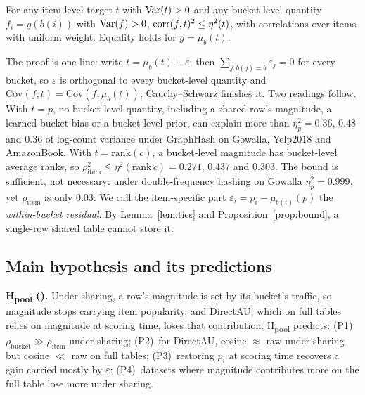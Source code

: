 \begin{proposition}\label{prop:bound}
For any item-level target $t$ with $\operatorname{Var}(t)>0$ and any bucket-level quantity $f_i=g(b(i))$ with $\operatorname{Var}(f)>0$, $\operatorname{corr}(f,t)^2\le\eta^2(t)$, with correlations over items with uniform weight. Equality holds for $g=\mu_b(t)$.
\end{proposition}
The proof is one line: write $t=\mu_{b}(t)+\varepsilon$; then $\sum_{j:b(j)=b}\varepsilon_j=0$ for every bucket, so $\varepsilon$ is orthogonal to every bucket-level quantity and $\mathrm{Cov}(f,t)=\mathrm{Cov}(f,\mu_b(t))$; Cauchy--Schwarz finishes it. Two readings follow.
With $t=p$, no bucket-level quantity, including a shared row's magnitude, a learned bucket bias or a bucket-level prior, can explain more than $\eta^2_p=0.36$, $0.48$ and $0.36$ of log-count variance under GraphHash on Gowalla, Yelp2018 and AmazonBook.
With $t=\mathrm{rank}(c)$, a bucket-level magnitude has bucket-level average ranks, so $\rho_{\mathrm{item}}^2\le\eta^2(\mathrm{rank}\,c)=0.271$, $0.437$ and $0.303$. The bound is sufficient, not necessary: under double-frequency hashing on Gowalla $\eta^2_p=0.999$, yet $\rho_{\mathrm{item}}$ is only $0.03$.
We call the item-specific part $\varepsilon_i=p_i-\mu_{b(i)}(p)$ the \emph{within-bucket residual}. By Lemma~\ref{lem:ties} and Proposition~\ref{prop:bound}, a single-row shared table cannot store it.

\subsection{Main hypothesis and its predictions}\label{sec:hypothesis}
\textbf{H\textsubscript{pool} (\pooling).} Under sharing, a row's magnitude is set by its bucket's traffic, so magnitude stops carrying item popularity, and DirectAU, which on full tables relies on magnitude at scoring time, loses that contribution.
H\textsubscript{pool} predicts:
(P1)~$\rho_{\mathrm{bucket}}\gg\rho_{\mathrm{item}}$ under sharing;
(P2)~for DirectAU, cosine $\approx$ raw under sharing but cosine $\ll$ raw on full tables;
(P3)~restoring $p_i$ at scoring time recovers a gain carried mostly by $\varepsilon$;
(P4)~datasets where magnitude contributes more on the full table lose more under sharing.


